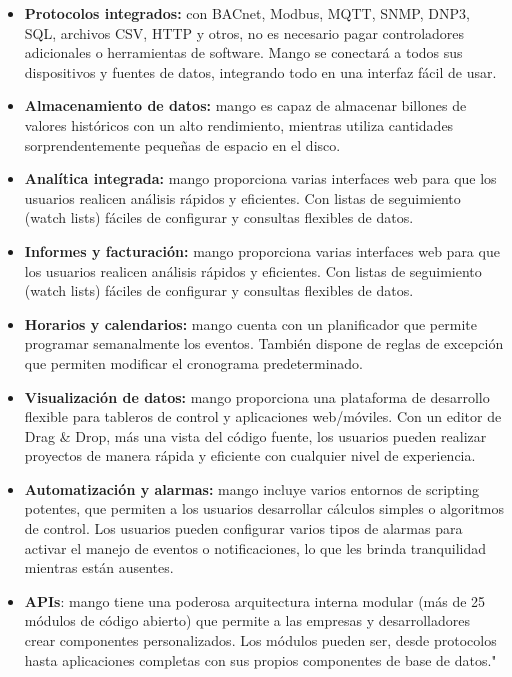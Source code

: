 	\begin{itemize}
	    \item \textbf{Protocolos integrados:} con BACnet, Modbus, MQTT, SNMP, DNP3, SQL, archivos CSV, HTTP y otros, no es necesario pagar controladores adicionales o herramientas de software. Mango se conectará a todos sus dispositivos y fuentes de datos, integrando todo en una interfaz fácil de usar.
	    
	    \item \textbf{Almacenamiento de datos:} mango es capaz de almacenar billones de valores históricos con un alto rendimiento, mientras utiliza cantidades sorprendentemente pequeñas de espacio en el disco.
	    
	    \item \textbf{Analítica integrada:} mango proporciona varias interfaces web para que los usuarios realicen análisis rápidos y eficientes. Con listas de seguimiento (watch lists) fáciles de configurar y consultas flexibles de datos.
	    
	    \item \textbf{Informes y facturación:} mango proporciona varias interfaces web para que los usuarios realicen análisis rápidos y eficientes. Con listas de seguimiento (watch lists) fáciles de configurar y consultas flexibles de datos.
	    
	    \item \textbf{Horarios y calendarios:} mango cuenta con un planificador que permite programar semanalmente los eventos. También dispone de reglas de excepción que permiten modificar el cronograma predeterminado.
	    
	    \item \textbf{Visualización de datos:}  mango proporciona una plataforma de desarrollo flexible para tableros de control y aplicaciones web/móviles. Con un editor de Drag {\&} Drop, más una vista del código fuente, los usuarios pueden realizar proyectos de manera rápida y eficiente con cualquier nivel de experiencia.
	    
	    \item \textbf{Automatización y alarmas:} mango incluye varios entornos de scripting potentes, que permiten a los usuarios desarrollar cálculos simples o algoritmos de control. Los usuarios pueden configurar varios tipos de alarmas para activar el manejo de eventos o notificaciones, lo que les brinda tranquilidad mientras están ausentes.
	    
	    \item \textbf{APIs}: mango tiene una poderosa arquitectura interna modular (más de 25 módulos de código abierto) que permite a las empresas y desarrolladores crear componentes personalizados. Los módulos pueden ser, desde protocolos hasta aplicaciones completas con sus propios componentes de base de datos."\textcolor{blue}{\cite{MANGO2}}
	    
	\end{itemize}
	
